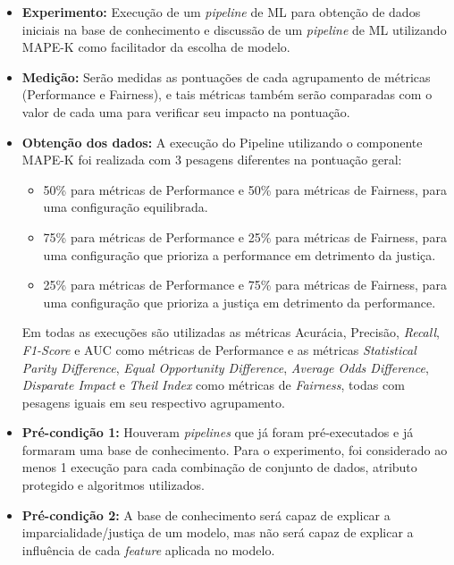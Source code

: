 \documentclass[portugues]{ic-tese}
\begin{document}
\begin{itemize}
\item \textbf{Experimento:} Execução de um \textit{pipeline} de ML para obtenção de dados iniciais na base de conhecimento e discussão de um \textit{pipeline} de ML utilizando MAPE-K como facilitador da escolha de modelo.

\item \textbf{Medição:} Serão medidas as pontuações de cada agrupamento de métricas (Performance e Fairness), e tais métricas também serão comparadas com o valor de cada uma para verificar seu impacto na pontuação.

\item \textbf{Obtenção dos dados:} A execução do Pipeline utilizando o componente MAPE-K foi realizada com 3 pesagens diferentes na pontuação geral:

\begin{itemize}
\item 50\% para métricas de Performance e 50\% para métricas de Fairness, para uma configuração equilibrada.
\item 75\% para métricas de Performance e 25\% para métricas de Fairness, para uma configuração que prioriza a performance em detrimento da justiça.
\item 25\% para métricas de Performance e 75\% para métricas de Fairness, para uma configuração que prioriza a justiça em detrimento da performance.
\end{itemize}

Em todas as execuções são utilizadas as métricas Acurácia, Precisão, \textit{Recall}, \textit{F1-Score} e AUC como métricas de Performance e as métricas \textit{Statistical Parity Difference}, \textit{Equal Opportunity Difference}, \textit{Average Odds Difference}, \textit{Disparate Impact} e \textit{Theil Index} como métricas de \textit{Fairness}, todas com pesagens iguais em seu respectivo agrupamento.

\item \textbf{Pré-condição 1:} Houveram \textit{pipelines} que já foram pré-executados e já formaram uma base de conhecimento. Para o experimento, foi considerado ao menos 1 execução para cada combinação de conjunto de dados, atributo protegido e algoritmos utilizados.

\item \textbf{Pré-condição 2:} A base de conhecimento será capaz de explicar a imparcialidade/justiça de um modelo, mas não será capaz de explicar a influência de cada \textit{feature} aplicada no modelo.


\end{itemize}
\end{document}
